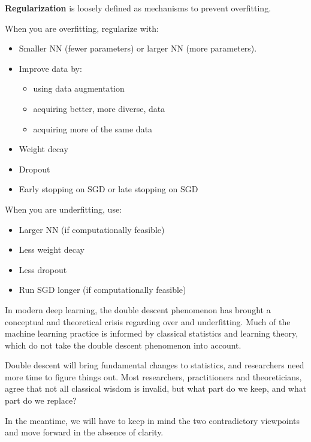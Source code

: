 \documentclass{report}
\begin{document}
\begin{concept}
    \textbf{Regularization} is loosely defined as mechanisms to prevent overfitting.

    When you are overfitting, regularize with:

    \begin{itemize}
        \item Smaller NN (fewer parameters) or larger NN (more parameters).
        \item
        Improve data by:

        \begin{itemize}
            \item using data augmentation
            \item acquiring better, more diverse, data
            \item acquiring more of the same data
        \end{itemize}
        \item Weight decay
        \item Dropout
        \item Early stopping on SGD or late stopping on SGD
    \end{itemize}
\end{concept}

\begin{concept}
    When you are underfitting, use:

    \begin{itemize}
        \item Larger NN (if computationally feasible)
        \item Less weight decay
        \item Less dropout
        \item Run SGD longer (if computationally feasible)
    \end{itemize}
\end{concept}

\begin{concept}
    In modern deep learning, the double descent phenomenon has brought a conceptual and theoretical crisis regarding over and underfitting. Much of the machine learning practice is informed by classical statistics and learning theory, which do not take the double descent phenomenon into account.

    Double descent will bring fundamental changes to statistics, and researchers need more time to figure things out. Most researchers, practitioners and theoreticians, agree that not all classical wisdom is invalid, but what part do we keep, and what part do we replace?

    In the meantime, we will have to keep in mind the two contradictory viewpoints and move forward in the absence of clarity.
\end{concept}
\end{document}
